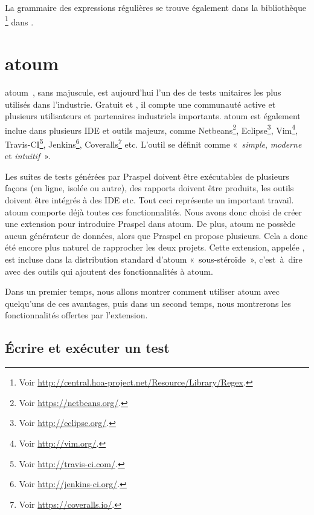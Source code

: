 La grammaire des expressions régulières se trouve également dans la bibliothèque
\footnote{Voir
\url{http://central.hoa-project.net/Resource/Library/Regex}.} dans
.

\section{atoum}
\label{section:tools:atoum}

atoum~, sans majuscule, est aujourd'hui l'un des
 de tests unitaires les plus utilisés dans l'industrie.
Gratuit et , il compte une communauté active et plusieurs
utilisateurs et partenaires industriels importants. atoum est également inclue
dans plusieurs IDE et outils majeurs, comme Netbeans\footnote{Voir
\url{https://netbeans.org/}.}, Eclipse\footnote{Voir
\url{http://eclipse.org/}.}, Vim\footnote{Voir \url{http://vim.org/}.},
Travis-CI\footnote{Voir \url{http://travis-ci.com/}.}, Jenkins\footnote{Voir
\url{http://jenkins-ci.org/}.}, Coveralls\footnote{Voir
\url{https://coveralls.io/}.} etc. L'outil se définit comme «~{\em simple}, {\em
moderne} et {\em intuitif}~».

Les suites de tests générées par Praspel doivent être exécutables de plusieurs
façons (en ligne, isolée ou autre), des rapports doivent être produits, les
outils doivent être intégrés à des IDE etc. Tout ceci représente un important
travail. atoum comporte déjà toutes ces fonctionnalités. Nous avons donc choisi
de créer une extension pour introduire Praspel dans atoum. De plus, atoum ne
possède aucun générateur de données, alors que Praspel en propose plusieurs.
Cela a donc été encore plus naturel de rapprocher les deux projets. Cette
extension, appelée , est incluse dans la
distribution standard d'atoum «~sous-stéroïde~», c'est~à~dire avec des outils
qui ajoutent des fonctionnalités à atoum.

Dans un premier temps, nous allons montrer comment utiliser atoum avec
quelqu'uns de ces avantages, puis dans un second temps, nous montrerons les
fonctionnalités offertes par l'extension.

\subsection{Écrire et exécuter un test}

